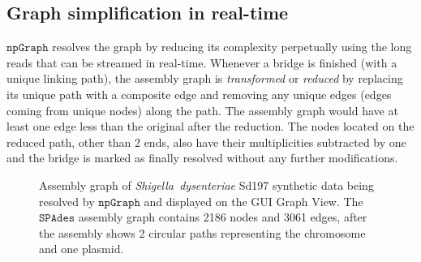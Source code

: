 \documentclass[10pt,twocolumn,twoside]{genpaper}
\newcommand{\npgraph}{$\mathtt{npGraph}$}
\newcommand{\spades}{$\mathtt{SPAdes}$}
\begin{document}
\subsection*{Graph simplification in real-time}
\npgraph{} resolves the graph by reducing its complexity perpetually using the long reads that can be streamed in real-time.
Whenever a bridge is finished (with a unique linking path), the assembly graph is \emph{transformed} or \emph{reduced} by replacing its unique path with a composite edge and removing any unique edges (edges coming from unique nodes) along the path. The assembly graph would have at least one edge less than the original after the reduction. The nodes located on the reduced path, other than 2 ends, also have their multiplicities subtracted by one and the bridge is marked as finally resolved without any further modifications. 

\begin{figure}[!hpt]
\centering
{}
\hfill
{}
\caption[Assembly graph resolving on \npgraph{} Graph View]{Assembly graph of \emph{Shigella~dysenteriae} Sd197 synthetic data being resolved by \npgraph{} and displayed on the GUI Graph View. The \spades{} assembly graph contains 2186 nodes and 3061 edges, after the assembly shows 2 circular paths representing the chromosome and one plasmid.}
\label{figure:npgraph_graphview}
\end{figure}
\end{document}
